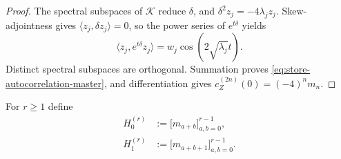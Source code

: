 \documentclass[11pt]{article}
\theoremstyle{definition}
\theoremstyle{remark}
\begin{document}
\begin{proof}
The spectral subspaces of $\mathscr K$ reduce $\delta$, and
$\delta^2z_j=-4\lambda_jz_j$.  Skew-adjointness gives
$\langle z_j,\delta z_j\rangle=0$, so the power series of $e^{t\delta}$ yields
\[
  \langle z_j,e^{t\delta}z_j\rangle
  =w_j\cos(2\sqrt{\lambda_j}t).
\]
Distinct spectral subspaces are orthogonal.  Summation proves
\eqref{eq:store-autocorrelation-master}, and differentiation gives
$c_Z^{(2n)}(0)=(-4)^nm_n$.
\end{proof}

For $r\ge1$ define
\begin{align}
  H_0^{(r)}&:=\bigl[m_{a+b}\bigr]_{a,b=0}^{r-1},
  \label{eq:store-H0-master}\\
  H_1^{(r)}&:=\bigl[m_{a+b+1}\bigr]_{a,b=0}^{r-1}.
  \label{eq:store-H1-master}
\end{align}
\end{document}
